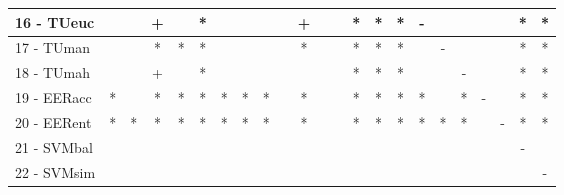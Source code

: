 \begin{table}[h]
\begin{center}
\begin{tabular}{lcc|cc|cc|cc|cc|cc|cc|cc|cc|cc|cc}
16 - TUeuc	&   &   & + &   & * &   &   &   &   & + &   &   & * & * & * & - &   &   &   &   & * & * \\ \hline
17 - TUman	&   &   & * & * & * &   &   &   &   & * &   &   & * & * & * &   & - &   &   &   & * & * \\
18 - TUmah	&   &   & + &   & * &   &   &   &   &   &   &   & * & * & * &   &   & - &   &   & * & * \\ \hline
19 - EERacc	& * &   & * & * & * & * & * & * &   & * &   &   & * & * & * & * &   & * & - &   & * & * \\
20 - EERent	& * & * & * & * & * & * & * & * &   & * &   &   & * & * & * & * & * & * &   & - & * & * \\ \hline
21 - SVMbal	&   &   &   &   &   &   &   &   &   &   &   &   &   &   &   &   &   &   &   &   & - &   \\
22 - SVMsim	&   &   &   &   &   &   &   &   &   &   &   &   &   &   &   &   &   &   &   &   &   & - \\ \hline\end{tabular}

\label{stratsfriedRFw}
\end{center}
\end{table}